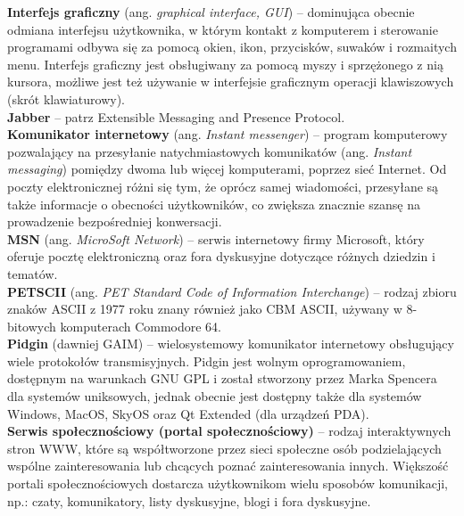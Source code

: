 \documentclass[a4paper,12pt]{article}
\begin{document}
\noindent\textbf{Interfejs graficzny} (ang. \textit{graphical interface, GUI}) -- dominująca obecnie odmiana interfejsu użytkownika, w którym kontakt z komputerem i sterowanie programami odbywa się za pomocą okien, ikon, przycisków, suwaków i rozmaitych menu. Interfejs graficzny jest obsługiwany za pomocą myszy i sprzężonego z nią kursora, możliwe jest też używanie w interfejsie graficznym operacji klawiszowych (skrót klawiaturowy).\\

\noindent\textbf{Jabber} -- patrz Extensible Messaging and Presence Protocol.\\

\noindent\textbf{Komunikator internetowy} (ang. \textit{Instant messenger}) -- program komputerowy pozwalający na przesyłanie natychmiastowych komunikatów (ang. \textit{Instant messaging}) pomiędzy dwoma lub więcej komputerami, poprzez sieć Internet. Od poczty elektronicznej różni się tym, że oprócz samej wiadomości, przesyłane są także informacje o obecności użytkowników, co zwiększa znacznie szansę na prowadzenie bezpośredniej konwersacji.\\

\noindent\textbf{MSN} (ang. \textit{MicroSoft Network}) -- serwis internetowy firmy Microsoft, który oferuje pocztę elektroniczną oraz fora dyskusyjne dotyczące różnych dziedzin i tematów.\\

\noindent\textbf{PETSCII} (ang. \textit{PET Standard Code of Information Interchange}) -- rodzaj zbioru znaków ASCII z 1977 roku znany również jako CBM ASCII, używany w 8-bitowych komputerach Commodore 64.\\

\noindent\textbf{Pidgin} (dawniej GAIM) -- wielosystemowy komunikator internetowy obsługujący wiele protokołów transmisyjnych. Pidgin jest wolnym oprogramowaniem, dostępnym na warunkach GNU GPL i został stworzony przez Marka Spencera dla systemów uniksowych, jednak obecnie jest dostępny także dla systemów Windows, MacOS, SkyOS oraz Qt Extended (dla urządzeń PDA).\\

\noindent\textbf{Serwis społecznościowy (portal społecznościowy)} -- rodzaj interaktywnych stron WWW, które są współtworzone przez sieci społeczne osób podzielających wspólne zainteresowania lub chcących poznać zainteresowania innych. Większość portali społecznościowych dostarcza użytkownikom wielu sposobów komunikacji, np.: czaty, komunikatory, listy dyskusyjne, blogi i fora dyskusyjne.\\
\end{document}
